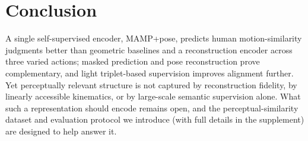 \documentclass[letterpaper]{article} %
\begin{document}

\section{Conclusion}
A single self-supervised encoder, MAMP+pose, predicts human motion-similarity judgments better than
geometric baselines and a reconstruction encoder across three varied actions; masked prediction and pose
reconstruction prove complementary, and light triplet-based supervision improves alignment further. Yet
perceptually relevant structure is not captured by reconstruction fidelity, by linearly accessible
kinematics, or by large-scale semantic supervision alone. What such a
representation should encode remains open, and the perceptual-similarity dataset and evaluation protocol we introduce (with full details in the supplement) are designed to help answer it.




\end{document}
